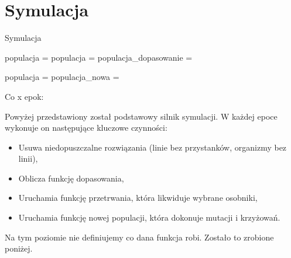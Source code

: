 \documentclass[12pt,a4paper,openright]{mwrep}
\begin{document}
\section{Symulacja}
\begin{algorithm}[H]
    \caption{Symulacja}
    \begin{algorithmic}[1]
        \State populacja = 
        \State {}
        \State populacja = 
        \State populacja\_dopasowanie = 

        \State populacja = 
        \State populacja\_nowa =  

        Co x epok:
        \State {}
        \EndFor
        \EndFunction
    \end{algorithmic}
\end{algorithm}

Powyżej przedstawiony został podstawowy silnik symulacji. W każdej epoce wykonuje on następujące kluczowe czynności:
\begin{itemize}
    \item Usuwa niedopuszczalne rozwiązania (linie bez przystanków, organizmy bez linii),
    \item Oblicza funkcję dopasowania,
    \item Uruchamia funkcję przetrwania, która likwiduje wybrane osobniki,
    \item Uruchamia funkcję nowej populacji, która dokonuje mutacji i krzyżowań.
\end{itemize}

Na tym poziomie nie definiujemy co dana funkcja robi. Zostało to zrobione poniżej.
\end{document}
